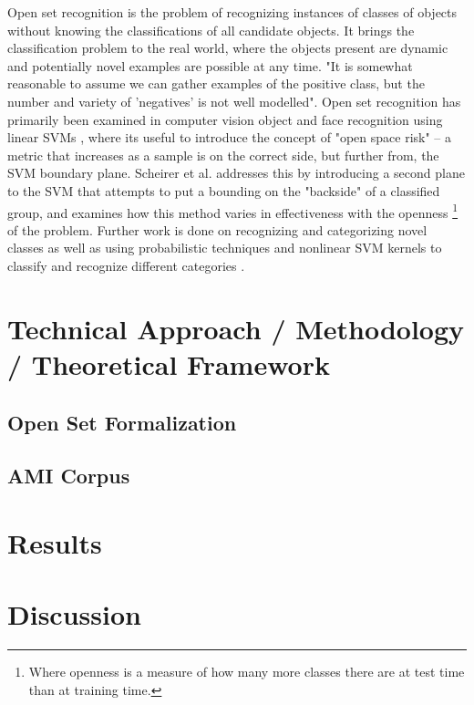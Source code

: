 \documentclass{article}
\begin{document}
Open set recognition is the problem of recognizing instances of classes of objects without knowing the classifications of all candidate objects. It brings the classification problem to the real world, where the objects present are dynamic and potentially novel examples are possible at any time. "It is somewhat reasonable to assume we can gather examples of the positive class, but the number and variety of 'negatives' is not well modelled"\cite{scheirer_toward_2013}. Open set recognition has primarily been examined in computer vision object and face recognition using linear SVMs \cite{scheirer_toward_2013} \cite{bendale_towards_2015}, where its useful to introduce the concept of "open space risk" -- a metric that increases as a sample is on the correct side, but further from, the SVM boundary plane. Scheirer et al. \cite{scheirer_toward_2013} addresses this by introducing a second plane to the SVM that attempts to put a bounding on the "backside" of a classified group, and examines how this method varies in effectiveness with the openness \footnote{Where openness is a measure of how many more classes there are at test time than at training time.} of the problem. Further work is done on recognizing and categorizing novel classes \cite{bendale_towards_2015} as well as using probabilistic techniques and nonlinear SVM kernels to classify and recognize different categories \cite{scheirer_probability_2014} \cite{jain_multi-class_2014}.

\section{Technical Approach / Methodology / Theoretical Framework}\label{formalization}

\subsection{Open Set Formalization}

\subsection{AMI Corpus}


\section{Results}

\section{Discussion}



\end{document}
